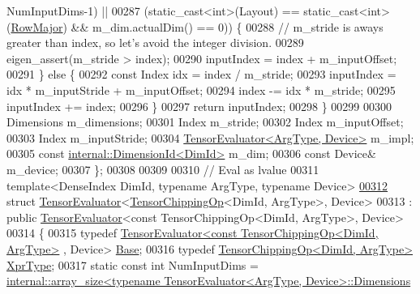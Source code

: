 \begin{DoxyCode}
      NumInputDims-1) ||
00287            (static\_cast<int>(Layout) == \textcolor{keyword}{static\_cast<}\textcolor{keywordtype}{int}\textcolor{keyword}{>}(\hyperlink{group__enums_ggaacded1a18ae58b0f554751f6cdf9eb13acfcde9cd8677c5f7caf6bd603666aae3}{RowMajor}) && m\_dim.actualDim() == 0)) \{
00288       \textcolor{comment}{// m\_stride is aways greater than index, so let's avoid the integer division.}
00289       eigen\_assert(m\_stride > index);
00290       inputIndex = index + m\_inputOffset;
00291     \} \textcolor{keywordflow}{else} \{
00292       \textcolor{keyword}{const} Index idx = index / m\_stride;
00293       inputIndex = idx * m\_inputStride + m\_inputOffset;
00294       index -= idx * m\_stride;
00295       inputIndex += index;
00296     \}
00297     \textcolor{keywordflow}{return} inputIndex;
00298   \}
00299 
00300   Dimensions m\_dimensions;
00301   Index m\_stride;
00302   Index m\_inputOffset;
00303   Index m\_inputStride;
00304   \hyperlink{struct_eigen_1_1_tensor_evaluator}{TensorEvaluator<ArgType, Device>} m\_impl;
00305   \textcolor{keyword}{const} \hyperlink{struct_eigen_1_1internal_1_1_dimension_id}{internal::DimensionId<DimId>} m\_dim;
00306   \textcolor{keyword}{const} Device& m\_device;
00307 \};
00308 
00309 
00310 \textcolor{comment}{// Eval as lvalue}
00311 \textcolor{keyword}{template}<DenseIndex DimId, \textcolor{keyword}{typename} ArgType, \textcolor{keyword}{typename} Device>
\hyperlink{struct_eigen_1_1_tensor_evaluator_3_01_tensor_chipping_op_3_01_dim_id_00_01_arg_type_01_4_00_01_device_01_4}{00312} \textcolor{keyword}{struct }\hyperlink{struct_eigen_1_1_tensor_evaluator}{TensorEvaluator}<\hyperlink{class_eigen_1_1_tensor_chipping_op}{TensorChippingOp}<DimId, ArgType>, Device>
00313   : \textcolor{keyword}{public} \hyperlink{struct_eigen_1_1_tensor_evaluator}{TensorEvaluator}<const TensorChippingOp<DimId, ArgType>, Device>
00314 \{
00315   \textcolor{keyword}{typedef} \hyperlink{struct_eigen_1_1_tensor_evaluator}{TensorEvaluator<const TensorChippingOp<DimId, ArgType>}
      , Device> \hyperlink{struct_eigen_1_1_tensor_evaluator_3_01const_01_tensor_chipping_op_3_01_dim_id_00_01_arg_type_01_4_00_01_device_01_4}{Base};
00316   \textcolor{keyword}{typedef} \hyperlink{class_eigen_1_1_tensor_chipping_op}{TensorChippingOp<DimId, ArgType>} 
      \hyperlink{class_eigen_1_1_tensor_chipping_op}{XprType};
00317   \textcolor{keyword}{static} \textcolor{keyword}{const} \textcolor{keywordtype}{int} NumInputDims = 
      \hyperlink{struct_eigen_1_1internal_1_1array__size}{internal::array\_size<typename TensorEvaluator<ArgType, Device>::Dimensions}

\end{DoxyCode}
